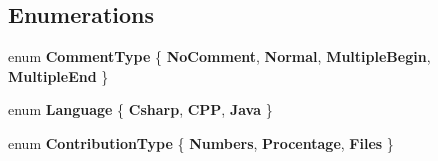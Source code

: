 \subsection*{Enumerations}
\begin{DoxyCompactItemize}
\item 
\mbox{\label{namespace_code_analizer_a0750b6616217c32fc7933a3a329ff8b2}} 
enum {\bfseries Comment\+Type} \{ {\bfseries No\+Comment}, 
{\bfseries Normal}, 
{\bfseries Multiple\+Begin}, 
{\bfseries Multiple\+End}
 \}
\item 
\mbox{\label{namespace_code_analizer_adc3f40e01721303a88831bfcc90f8eae}} 
enum {\bfseries Language} \{ {\bfseries Csharp}, 
{\bfseries C\+PP}, 
{\bfseries Java}
 \}
\item 
\mbox{\label{namespace_code_analizer_a0be1d7edf4463e31c78bd9637e764014}} 
enum {\bfseries Contribution\+Type} \{ {\bfseries Numbers}, 
{\bfseries Procentage}, 
{\bfseries Files}
 \}
\end{DoxyCompactItemize}
